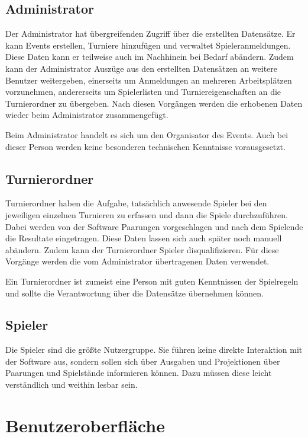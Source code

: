 \documentclass[11pt]{article}
\begin{document}
\subsection{Administrator}

Der Administrator hat übergreifenden Zugriff über die erstellten Datensätze. Er kann Events erstellen, Turniere hinzufügen und verwaltet Spieleranmeldungen. Diese Daten kann er teilweise auch im Nachhinein bei Bedarf abändern. Zudem kann der Administrator Auszüge aus den erstellten Datensätzen an weitere Benutzer weitergeben, einerseits um Anmeldungen an mehreren Arbeitsplätzen vorzunehmen, andererseits um Spielerlisten und Turniereigenschaften an die Turnierordner zu übergeben. Nach diesen Vorgängen werden die erhobenen Daten wieder beim Administrator zusammengefügt.

Beim Administrator handelt es sich um den Organisator des Events. Auch bei dieser Person werden keine besonderen technischen Kenntnisse vorausgesetzt.

\subsection{Turnierordner}

Turnierordner haben die Aufgabe, tatsächlich anwesende Spieler bei den jeweiligen einzelnen Turnieren zu erfassen und dann die Spiele durchzuführen. Dabei werden von der Software Paarungen vorgeschlagen und nach dem Spielende die Resultate eingetragen. Diese Daten lassen sich auch später noch manuell abändern. Zudem kann der Turnierordner Spieler disqualifizieren. Für diese Vorgänge werden die vom Administrator übertragenen Daten verwendet.

Ein Turnierordner ist zumeist eine Person mit guten Kenntnissen der Spielregeln und sollte die Verantwortung über die Datensätze übernehmen können.

\subsection{Spieler}

Die Spieler sind die größte Nutzergruppe. Sie führen keine direkte Interaktion mit der Software aus, sondern sollen sich über Ausgaben und Projektionen über Paarungen und Spielstände informieren können. Dazu müssen diese leicht verständlich und weithin lesbar sein.

\newpage

\section{Benutzeroberfläche}
\end{document}
